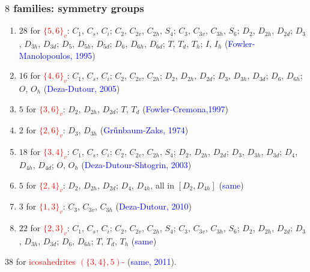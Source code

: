 \documentclass{beamer}
\begin{document}
\begin{frame}\frametitle{$8$ families: symmetry  groups}
\vspace{-2mm}

\begin{enumerate}
\item
$28$ for \textcolor{red}{$\{5,6\}_v$}:  
$C_1$, $C_s$, $C_i$; $C_2$, $C_{2v}$, $C_{2h}$, $S_4$; $C_3$,
$C_{3v}$, $C_{3h}$, $S_6$; $D_2$, $D_{2h}$, $D_{2d}$; $D_3$,  
$D_{3h}$, $D_{3d}$; $D_5$, $D_{5h}$, $D_{5d}$; $D_6$, $D_{6h}$,
$D_{6d}$; $T$, $T_d$, $T_h$; $I$, $I_h$ 
(\textcolor{blue}{Fowler-Manolopoulos, 1995})
\item
$16$ for \textcolor{red}{$\{4,6\}_v$}: $C_1$, $C_s$,
$C_{i}$; $C_2$, $C_{2v}$, $C_{2h}$; $D_2$, $D_{2h}$, $D_{2d}$; $D_3$,
$D_{3h}$, $D_{3d}$; $D_6$, $D_{6h}$; $O$, $O_h$
(\textcolor{blue}{Deza-Dutour,  2005})
\item
$5$ for \textcolor{red}{$\{3,6\}_v$}: $D_{2}$,
$D_{2h}$, $D_{2d}$; $T$, $T_d$ (\textcolor{blue}{Fowler-Cremona,1997})
\item
$2$ for \textcolor{red}{$\{2, 6\}_v$}: $D_3$, $D_{3h}$ 
(\textcolor{blue}{Gr\H{u}nbaum-Zaks, 1974})
\item
$18$ for \textcolor{red}{$\{3, 4\}_v$}: $C_{1}$, $C_s$,
$C_i$; $C_2$, $C_{2v}$, $C_{2h}$, $S_4$; $D_2$, $D_{2h}$, $D_{2d}$;
$D_3$, $D_{3h}$, $D_{3d}$; $D_4$,
$D_{4h}$, $D_{4d}$; $O$, $O_h$   
(\textcolor{blue}{Deza-Dutour-Shtogrin, 2003})
\item
$5$ for \textcolor{red}{$\{2, 4\}_v$}: $D_2$, $D_{2h}$, 
$D_{2d}$; $D_4$, $D_{4h}$, all in $[D_2,D_{4h}]$ (\textcolor{blue}{same})
\item
$3$ for \textcolor{red}{$\{1, 3\}_v$}:  $C_3$,
$C_{3v}$,  $C_{3h}$ (\textcolor{blue}{Deza-Dutour,  2010})
\item
$22$ for \textcolor{red}{$\{2, 3\}_v$}: $C_1$, 
$C_s$, $C_i$; $C_2$, $C_{2v}$, $C_{2h}$,  $S_4$; $C_3$,
$C_{3v}$, $C_{3h}$, $S_6$; $D_2$, $D_{2h}$, $D_{2d}$; $D_3$,
$D_{3h}$, $D_{3d}$; $D_6$, $D_{6h}$; $T$, $T_d$, $T_h$ 
(\textcolor{blue}{same}) 
\end{enumerate}
$38$ for  \textcolor{red}{icosahedrites $(\{3,4\},5)$-} 
(\textcolor{blue}{same, 2011}).
\end{frame}
\end{document}
